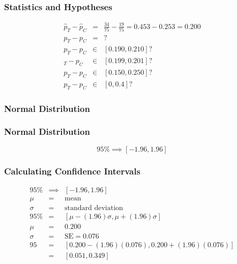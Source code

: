 \documentclass{beamer}
\begin{document}
\begin{frame}
  \frametitle{Statistics and Hypotheses}
  \begin{displaymath}
    \begin{array}{rcl}
      \hat{p}_T - \hat{p}_C & = & \frac{34}{75} - \frac{19}{75} =
      0.453 - 0.253 = 0.200 \\[0.5cm]
      p_T - p_C & = & ? \\[0.5cm]
      p_T - p_C & \in & [0.190, 0.210]? \\[0.5cm]
      _T - p_C & \in & [0.199, 0.201]? \\[0.5cm]
      p_T - p_C & \in & [0.150, 0.250]? \\[0.5cm]
      p_T - p_C & \in & [0, 0.4]?
    \end{array}
  \end{displaymath}
\end{frame}

\begin{frame}
  \frametitle{Normal Distribution}
  \centering
\end{frame}

\begin{frame}
  \frametitle{Normal Distribution}
  \centering
  \begin{equation*}
    95\% \implies [-1.96, 1.96]
  \end{equation*}
\end{frame}

\begin{frame}
  \frametitle{Calculating Confidence Intervals}
  \begin{displaymath}
    \begin{array}{rcl}
      95\% & \implies & [-1.96, 1.96] \\[1em]
      \mu & = & \text{mean} \\[1em]
      \sigma & = & \text{standard deviation} \\[1em]
      95\%& = & [\mu - (1.96) \sigma, \mu +
      (1.96) \sigma] \\[1em]
      \mu & = & 0.200 \\[1em]
      \sigma & = & \text{SE} = 0.076 \\[1em]
      95 & = & [0.200 - (1.96)(0.076), 0.200 + (1.96)(0.076)] \\[1em]
      & = & [0.051, 0.349]
    \end{array}
  \end{displaymath} 
\end{frame}
\end{document}
